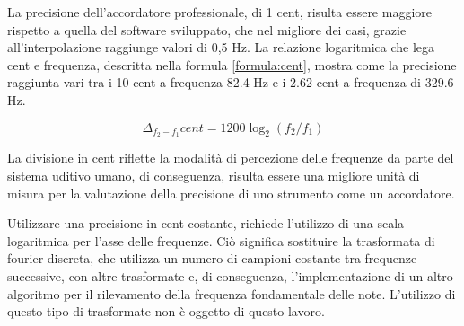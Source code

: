 La precisione dell'accordatore professionale, di 1 cent, risulta essere maggiore rispetto a quella del software sviluppato, che nel migliore dei casi, grazie all'interpolazione raggiunge valori di 0,5 Hz.
La relazione logaritmica che lega cent e frequenza, descritta nella formula \ref{formula:cent}, mostra come la precisione raggiunta vari tra i 10 cent a frequenza 82.4 Hz e i 2.62 cent a frequenza di 329.6 Hz.

\begin{equation}\label{formula:cent}
		\Delta_{f_2-f_1} cent = 1200 \log_2 \left( f_2/f_1 \right)
	\end{equation} 

La divisione in cent riflette la modalità di percezione delle frequenze da parte del sistema uditivo umano, di conseguenza, risulta essere una migliore unità di misura per la valutazione della precisione di uno strumento come un accordatore.

Utilizzare una precisione in cent costante, richiede l'utilizzo di una scala logaritmica per l'asse delle frequenze.
Ciò significa sostituire la trasformata di fourier discreta, che utilizza un numero di campioni costante tra frequenze successive, con altre trasformate e, di conseguenza, l'implementazione di un altro algoritmo per il rilevamento della frequenza fondamentale delle note.
L'utilizzo di questo tipo di trasformate non è oggetto di questo lavoro.

 

